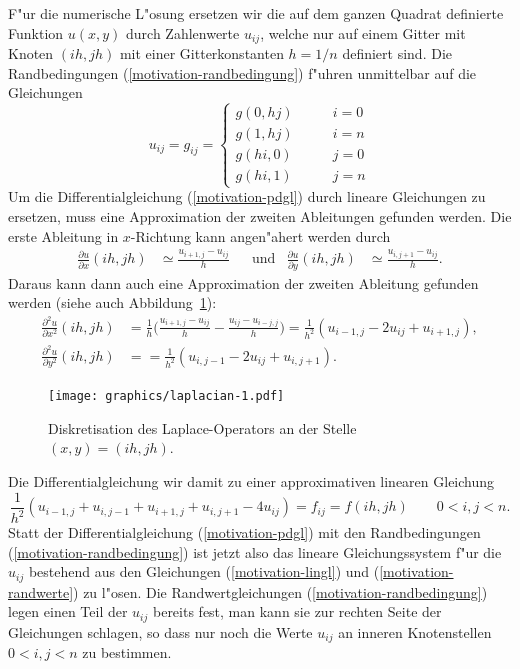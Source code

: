 F"ur die numerische L"osung ersetzen wir die auf dem ganzen Quadrat
definierte Funktion $u(x,y)$ durch Zahlenwerte $u_{ij}$, welche nur
auf einem Gitter mit Knoten $(ih, jh)$ mit einer Gitterkonstanten $h = 1/n$
definiert sind.
Die Randbedingungen (\ref{motivation-randbedingung}) f"uhren unmittelbar
auf die Gleichungen
\begin{equation}
u_{ij}=g_{ij}=\begin{cases}
g(0,hj)&\qquad i = 0\\
g(1,hj)&\qquad i = n\\
g(hi,0)&\qquad j = 0\\
g(hi,1)&\qquad j = n
\end{cases}
\label{motivation-randwerte}
\end{equation}
Um die Differentialgleichung (\ref{motivation-pdgl}) durch lineare Gleichungen
zu ersetzen, muss eine Approximation der zweiten Ableitungen
gefunden werden.
Die erste Ableitung in $x$-Richtung kann angen"ahert werden durch
\begin{align*}
\frac{\partial u}{\partial x}(ih,jh)&\simeq \frac{u_{i+1,j}-u_{ij}}h
&&\text{und}
&
\frac{\partial u}{\partial y}(ih,jh)&\simeq \frac{u_{i,j+1}-u_{ij}}h.
\end{align*}
Daraus kann dann auch eine Approximation der zweiten Ableitung
gefunden werden (siehe auch Abbildung~\ref{algorithm:laplacian}):
\begin{align*}
\frac{\partial^2 u}{\partial x^2}(ih,jh)&=\frac1h\biggl(
\frac{u_{i+1,j}-u_{ij}}h-\frac{u_{ij}-u_{i-j,j}}h
\biggr)
=\frac1{h^2}(u_{i-1,j}-2u_{ij}+u_{i+1,j}),\\
\frac{\partial^2 u}{\partial y^2}(ih,jh)&=
=\frac1{h^2}(u_{i,j-1}-2u_{ij}+u_{i,j+1}).
\end{align*}
\begin{figure}
\begin{center}
\texttt{[image: graphics/laplacian-1.pdf]}
\end{center}
\caption{Diskretisation des Laplace-Operators an der Stelle $(x,y)=(ih, jh)$.
\label{algorithm:laplacian}}
\end{figure}
Die Differentialgleichung wir damit zu einer approximativen linearen
Gleichung 
\begin{equation}
\frac1{h^2}(u_{i-1,j}+u_{i,j-1}+u_{i+1,j}+u_{i,j+1}-4u_{ij})=f_{ij}=f(ih,jh)
\qquad 0<i,j<n.
\label{motivation-lingl}
\end{equation}
Statt der Differentialgleichung (\ref{motivation-pdgl}) mit den Randbedingungen
(\ref{motivation-randbedingung}) ist jetzt also das lineare Gleichungssystem
f"ur die $u_{ij}$ bestehend aus den Gleichungen (\ref{motivation-lingl}) und
(\ref{motivation-randwerte}) zu l"osen.
Die Randwertgleichungen (\ref{motivation-randbedingung})
legen einen Teil der $u_{ij}$ bereits fest,
man kann sie zur rechten Seite der Gleichungen schlagen,
so dass nur noch die Werte $u_{ij}$ an inneren Knotenstellen $0<i,j<n$
zu bestimmen.

